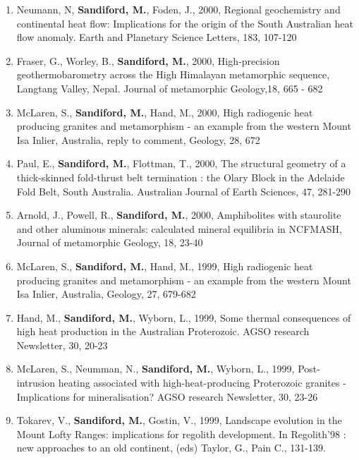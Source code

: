 \documentclass[
]{article}
\begin{document}
\begin{enumerate}
\item
  Neumann, N, \textbf{Sandiford, M.}, Foden, J., 2000, Regional
  geochemistry and continental heat flow: Implications for the origin of
  the South Australian heat flow anomaly. Earth and Planetary Science
  Letters, 183, 107-120 
\item
  Fraser, G., Worley, B., \textbf{Sandiford, M.}, 2000, High‐precision
  geothermobarometry across the High Himalayan metamorphic sequence,
  Langtang Valley, Nepal. Journal of metamorphic Geology,18, 665 - 682
\item
  McLaren, S., \textbf{Sandiford, M.}, Hand, M., 2000, High radiogenic
  heat producing granites and metamorphism - an example from the western
  Mount Isa Inlier, Australia, reply to comment, Geology, 28, 672
\item
  Paul, E., \textbf{Sandiford, M.}, Flottman, T., 2000, The structural
  geometry of a thick-skinned fold-thrust belt termination : the Olary
  Block in the Adelaide Fold Belt, South Australia. Australian Journal
  of Earth Sciences, 47, 281-290 
\item
  Arnold, J., Powell, R., \textbf{Sandiford, M.}, 2000, Amphibolites
  with staurolite and other aluminous minerals: calculated mineral
  equilibria in NCFMASH, Journal of metamorphic Geology, 18, 23-40
\item
  McLaren, S., \textbf{Sandiford, M.}, Hand, M., 1999, High radiogenic
  heat producing granites and metamorphism - an example from the western
  Mount Isa Inlier, Australia, Geology, 27, 679-682
\item
  Hand, M., \textbf{Sandiford, M.}, Wyborn, L., 1999, Some thermal
  consequences of high heat production in the Australian Proterozoic.
  AGSO research Newsletter, 30, 20-23 
\item
  McLaren, S., Neumman, N., \textbf{Sandiford, M.}, Wyborn, L., 1999,
  Post-intrusion heating associated with high-heat-producing Proterozoic
  granites - Implications for mineralisation? AGSO research Newsletter,
  30, 23-26 
\item
  Tokarev, V., \textbf{Sandiford, M.}, Gostin, V., 1999, Landscape
  evolution in the Mount Lofty Ranges: implications for regolith
  development. In Regolith'98 : new approaches to an old continent,
  (eds) Taylor, G., Pain C., 131-139. 

\end{enumerate}
\end{document}
